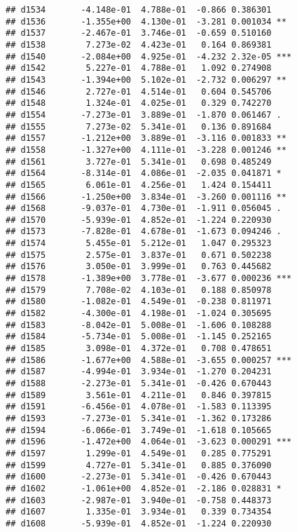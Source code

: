 \documentclass[
]{article}
\begin{document}
\begin{verbatim}
## d1534       -4.148e-01  4.788e-01  -0.866 0.386301    
## d1536       -1.355e+00  4.130e-01  -3.281 0.001034 ** 
## d1537       -2.467e-01  3.746e-01  -0.659 0.510160    
## d1538        7.273e-02  4.423e-01   0.164 0.869381    
## d1540       -2.084e+00  4.925e-01  -4.232 2.32e-05 ***
## d1542        5.227e-01  4.788e-01   1.092 0.274908    
## d1543       -1.394e+00  5.102e-01  -2.732 0.006297 ** 
## d1546        2.727e-01  4.514e-01   0.604 0.545706    
## d1548        1.324e-01  4.025e-01   0.329 0.742270    
## d1554       -7.273e-01  3.889e-01  -1.870 0.061467 .  
## d1555        7.273e-02  5.341e-01   0.136 0.891684    
## d1557       -1.212e+00  3.889e-01  -3.116 0.001833 ** 
## d1558       -1.327e+00  4.111e-01  -3.228 0.001246 ** 
## d1561        3.727e-01  5.341e-01   0.698 0.485249    
## d1564       -8.314e-01  4.086e-01  -2.035 0.041871 *  
## d1565        6.061e-01  4.256e-01   1.424 0.154411    
## d1566       -1.250e+00  3.834e-01  -3.260 0.001116 ** 
## d1568       -9.037e-01  4.730e-01  -1.911 0.056045 .  
## d1570       -5.939e-01  4.852e-01  -1.224 0.220930    
## d1573       -7.828e-01  4.678e-01  -1.673 0.094246 .  
## d1574        5.455e-01  5.212e-01   1.047 0.295323    
## d1575        2.575e-01  3.837e-01   0.671 0.502238    
## d1576        3.050e-01  3.999e-01   0.763 0.445682    
## d1578       -1.389e+00  3.778e-01  -3.677 0.000236 ***
## d1579        7.708e-02  4.103e-01   0.188 0.850978    
## d1580       -1.082e-01  4.549e-01  -0.238 0.811971    
## d1582       -4.300e-01  4.198e-01  -1.024 0.305695    
## d1583       -8.042e-01  5.008e-01  -1.606 0.108288    
## d1584       -5.734e-01  5.008e-01  -1.145 0.252165    
## d1585        3.098e-01  4.372e-01   0.708 0.478651    
## d1586       -1.677e+00  4.588e-01  -3.655 0.000257 ***
## d1587       -4.994e-01  3.934e-01  -1.270 0.204231    
## d1588       -2.273e-01  5.341e-01  -0.426 0.670443    
## d1589        3.561e-01  4.211e-01   0.846 0.397815    
## d1591       -6.456e-01  4.078e-01  -1.583 0.113395    
## d1593       -7.273e-01  5.341e-01  -1.362 0.173286    
## d1594       -6.066e-01  3.749e-01  -1.618 0.105665    
## d1596       -1.472e+00  4.064e-01  -3.623 0.000291 ***
## d1597        1.299e-01  4.549e-01   0.285 0.775291    
## d1599        4.727e-01  5.341e-01   0.885 0.376090    
## d1600       -2.273e-01  5.341e-01  -0.426 0.670443    
## d1602       -1.061e+00  4.852e-01  -2.186 0.028831 *  
## d1603       -2.987e-01  3.940e-01  -0.758 0.448373    
## d1607        1.335e-01  3.934e-01   0.339 0.734354    
## d1608       -5.939e-01  4.852e-01  -1.224 0.220930    

\end{verbatim}
\end{document}
